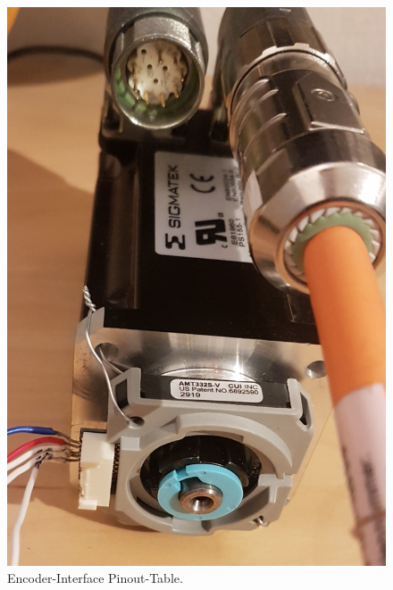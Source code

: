 \begin{figure}[H]
	\centering
	\includegraphics[angle = 270, width=\textwidth]{graphics/4_Encoder_Motor}
	\caption{Encoder-Interface Pinout-Table.}
	\label{fig:4_Encoder_Motor}
\end{figure}

